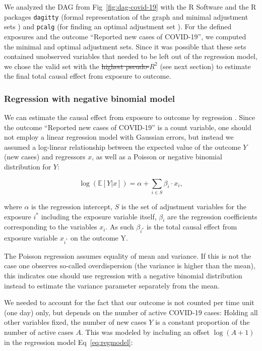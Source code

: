 \documentclass[10pt,letterpaper]{article}
\providecommand{\DIFaddtex}[1]{{\protect\color{blue}\uwave{#1}}} %
\providecommand{\DIFdeltex}[1]{{\protect\color{red}\sout{#1}}}                      %
\providecommand{\DIFaddbegin}{} %
\providecommand{\DIFaddend}{} %
\providecommand{\DIFdelbegin}{} %
\providecommand{\DIFdelend}{} %
\providecommand{\DIFadd}[1]{\texorpdfstring{\DIFaddtex{#1}}{#1}} %
\providecommand{\DIFdel}[1]{\texorpdfstring{\DIFdeltex{#1}}{}} %
\newcommand{\DIFscaledelfig}{0.5}
\newlength{\DIFdelgraphicswidth} %
\newlength{\DIFdelgraphicsheight} %
\newcommand{\DIFaddincludegraphics}[2][]{{\color{blue}\fbox{\DIFOincludegraphics[#1]{#2}}}} %
\newcommand{\DIFdelincludegraphics}[2][]{%
\sbox{\DIFdelgraphicsbox}{\DIFOincludegraphics[#1]{#2}}%
\settoboxwidth{\DIFdelgraphicswidth}{\DIFdelgraphicsbox} %
\settoboxtotalheight{\DIFdelgraphicsheight}{\DIFdelgraphicsbox} %
\scalebox{\DIFscaledelfig}{%
\parbox[b]{\DIFdelgraphicswidth}{\usebox{\DIFdelgraphicsbox}\\[-\baselineskip] \rule{\DIFdelgraphicswidth}{0em}}\llap{\resizebox{\DIFdelgraphicswidth}{\DIFdelgraphicsheight}{%
\setlength{\unitlength}{\DIFdelgraphicswidth}%
\begin{picture}(1,1)%
\thicklines\linethickness{2pt} %
{\color[rgb]{1,0,0}\put(0,0){\framebox(1,1){}}}%
{\color[rgb]{1,0,0}\put(0,0){\line( 1,1){1}}}%
{\color[rgb]{1,0,0}\put(0,1){\line(1,-1){1}}}%
\end{picture}%
}\hspace*{3pt}}} %
} %
\DeclareRobustCommand{\DIFaddbegin}{\DIFOaddbegin \let\includegraphics\DIFaddincludegraphics} %
\DeclareRobustCommand{\DIFaddend}{\DIFOaddend \let\includegraphics\DIFOincludegraphics} %
\DeclareRobustCommand{\DIFdelbegin}{\DIFOdelbegin \let\includegraphics\DIFdelincludegraphics} %
\DeclareRobustCommand{\DIFdelend}{\DIFOaddend \let\includegraphics\DIFOincludegraphics} %
\begin{document}
We analyzed the DAG from Fig~\ref{fig:dag-covid-19} with the R Software
\cite{rsoftware} and the R packages \texttt{dagitty} (formal
representation of the graph and minimal adjustment sets
\cite{textor_robust_2017}) and \texttt{pcalg} (for finding an optimal
adjustment set \cite{pcalg}). For the defined exposures and the outcome
``Reported new cases of COVID-19'', we computed the minimal and optimal
adjustment sets. Since it was possible that these sets contained unobserved variables that needed to be left out of the regression model, we chose the valid set with the \DIFdelbegin \DIFdel{highest pseudo-\(R^2\) }\DIFdelend \DIFaddbegin \DIFadd{lowest AIC }\DIFaddend (see next section) to estimate the final total causal effect from exposure to outcome.

\subsubsection*{Regression with negative binomial
model}\label{regression-with-negative-binomial-model}

We can estimate the causal effect from exposure to outcome by regression
\cite{pearl2009causality}. Since the outcome ``Reported new cases of
COVID-19'' is a count variable, one should not employ a linear
regression model with Gaussian errors, but instead we assumed a
log-linear relationship between the expected value of the outcome \(Y\)
(new cases) and regressors \(x\), as well as a Poisson or negative
binomial distribution for \(Y\):

\begin{equation}
\log(\mathbb{E}[Y|x]) = \alpha + \sum_{i\in S}\beta_i\cdot x_{i}, \label{eq:regmodel}
\end{equation}

where \(\alpha\) is the regression intercept, \(S\) is the set of
adjustment variables for the exposure \(i^{\ast}\) including the
exposure variable itself, \(\beta_i\) are the regression coefficients
corresponding to the variables \(x_i\). As such \(\beta_{i^{\ast}}\) is
the total causal effect from exposure variable \(x_{i^{\ast}}\) on the
outcome Y.

The Poisson regression assumes equality of mean and variance. If this is
not the case one observes so-called overdispersion (the variance is
higher than the mean), this indicates one should use regression with a
negative binomial distribution instead to estimate the variance
parameter separately from the mean.

We needed to account for the fact that our outcome is not counted per
time unit (one day) only, but depends on the number of active COVID-19
cases: Holding all other variables fixed, the number of new cases \(Y\)
is a constant proportion of the number of active cases \(A\). This was
modeled by including an offset \(\log(A+1)\) in the regression model Eq~\eqref{eq:regmodel}:
\end{document}
